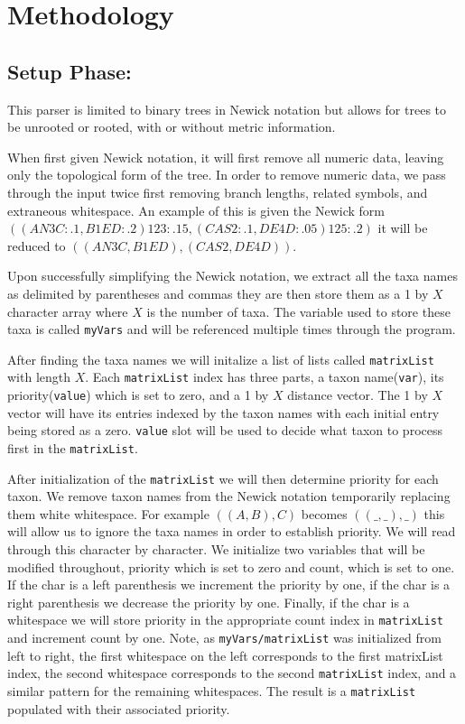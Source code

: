 \documentclass{article}
\begin{document}
\section{Methodology}
 
\subsection{Setup Phase:}

This parser is limited to binary trees in Newick notation but allows for trees to be unrooted or rooted, with or without metric information.

When first given Newick notation, it will first remove all numeric data, leaving only the topological form of the tree. In order to remove numeric data, we pass through the input twice first removing branch lengths, related symbols, and extraneous whitespace. An example of this is given the Newick form $((AN3C:.1,B1ED:.2)123:.15,(CAS2:.1,DE4D:.05 )125:.2)$ it will be reduced to $((AN3C,B1ED),(CAS2,DE4D))$. 

Upon successfully simplifying the Newick notation, we extract all the taxa names as delimited by parentheses and commas they are then store them as a 1 by $X$ character array where $X$ is the number of taxa. The variable used to store these taxa is called {\tt myVars} and will be referenced multiple times through the program. 

After finding the taxa names we will initalize a list of lists called {\tt matrixList} with length $X$. Each {\tt matrixList} index has three parts, a taxon name({\tt var}), its priority({\tt value}) which is set to zero, and a 1 by $X$ distance vector. The 1 by $X$ vector will have its entries indexed by the taxon names with each initial entry being stored as a zero. {\tt value} slot will be used to decide what taxon to process first in the {\tt matrixList}.

After initialization of the {\tt matrixList} we will then determine priority for each taxon. We remove taxon names from the Newick notation temporarily replacing them white whitespace. For example $((A,B),C)$ becomes $((\_,\_),\_)$ this will allow us to ignore the taxa names in order to establish priority. We will read through this character by character. We initialize two variables that will be modified throughout, priority which is set to zero and count, which is set to one. If the char is a left parenthesis we increment the priority by one, if the char is a right parenthesis we decrease the priority by one. Finally, if the char is a whitespace we will store priority in the appropriate count index in {\tt matrixList} and increment count by one. Note, as {\tt myVars/matrixList} was initialized from left to right, the first whitespace on the left corresponds to the first matrixList index, the second whitespace corresponds to the second {\tt matrixList} index, and a similar pattern for the remaining whitespaces. The result is a {\tt matrixList} populated with their associated priority. 
\end{document}

